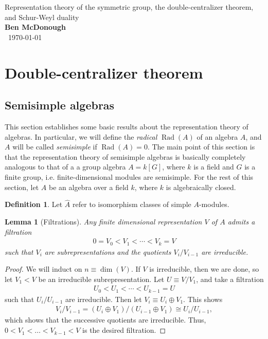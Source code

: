 \documentclass[11pt]{article}
\newtheorem{lem}{Lemma}
\theoremstyle{definition}
\newtheorem{defn}{Definition}
\newcommand{\Rad}{\operatorname{Rad}}
\begin{document}
\noindent\Large{Representation theory of the symmetric group, the
  double-centralizer theorem, and Schur-Weyl duality} \\
\normalsize{\textbf{Ben McDonough}}\\\
\normalsize{\today}

\tableofcontents

\section{Double-centralizer theorem}

\subsection{Semisimple algebras}
This section establishes some basic results about the representation theory of
algebras. In particular, we will define the \textit{radical} $\Rad(A)$
of an algebra $A$, and $A$ will be called \textit{semisimple} if
$\Rad(A) = 0$. The main point of this section is that the representation theory
of semisimple algebras is basically completely analogous to that of a a group
algebra $A = k[G]$, where $k$ is a field and $G$ is a finite group, i.e.
finite-dimensional modules are semisimple.
For the rest of this section, let $A$ be an algebra over a field $k$, where $k$
is algebraically closed.

\begin{defn}
Let $\hat A$ refer to isomorphism classes of simple $A$-modules.
\end{defn}


\begin{lem}[Filtrations]\label{lem:filtrations}
 Any finite dimensional representation $V$ of $A$ admits a \textit{filtration} 
 \begin{align}
   0 = V_0 < V_1 < \cdots  < V_k = V
 \end{align}
 such that $V_i$ are subrepresentations and the quotients $V_{i}/V_{i-1}$ are irreducible.
\end{lem}

\begin{proof}
  We will induct on $n \equiv \dim(V)$. If $V$ is irreducible, then we are done,
  so let $V_1 < V$ be an irreducible subrepresentation. Let $U \equiv V/V_1$, and take a filtration
  \begin{align}
    U_0 < U_1 < \cdots < U_{k-1} = U
  \end{align}
  such that $U_i/U_{i-1}$ are irreducible.
  Then let $V_i \equiv U_i \oplus V_1$.
  This shows
  \begin{align}
    V_i / V_{i-1} = (U_i \oplus V_1)/(U_{i-1}\oplus V_1) \cong U_i / U_{i-1},
  \end{align}
  which shows that the successive quotients are irreducible. Thus, $0 < V_1 <
  \dots < V_{k-1} < V$ is the desired filtration.
\end{proof}
\end{document}
